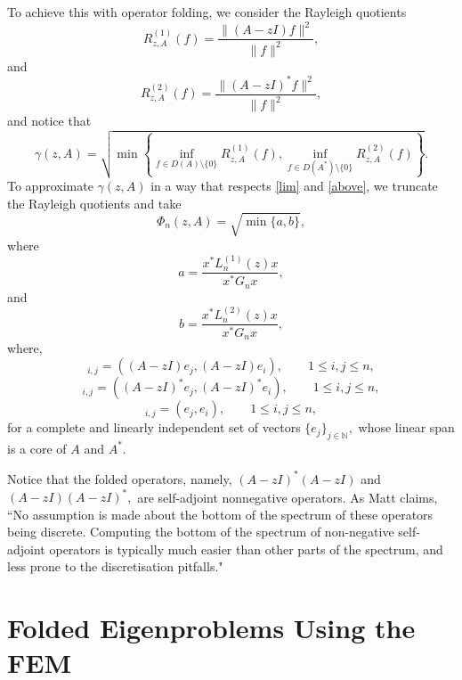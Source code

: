 \documentclass[12pt,a4paper]{article}
\theoremstyle{boldthm}
\theoremstyle{bolddefn}
\begin{document}
To achieve this with operator folding, we consider the Rayleigh quotients
\begin{equation}
    R_{z, A}^{(1)}(f) = \frac{\| (A-zI) f \|^2}{\|f\|^2}, 
\end{equation}
and 
\begin{equation}
    R_{z, A}^{(2)}(f) = \frac{\| (A-zI)^* f \|^2}{\|f\|^2},
\end{equation}
and notice that
\begin{equation}
    \gamma(z, A) = \sqrt{ \min \left\{ \inf_{f \in D(A) \setminus \{0\}} R_{z, A}^{(1)}(f) , \inf_{f \in D(A^*) \setminus \{0\}} R_{z, A}^{(2)}(f) \right\}}.
\end{equation}
To approximate $\gamma(z, A)$ in a way that respects \eqref{lim} and \eqref{above}, we truncate the Rayleigh quotients and take
\begin{equation}
    \Phi_n(z, A) = \sqrt{ \min\{a, b\} },
\end{equation}
where 
\begin{equation}
    a = \frac{x^* L_n^{(1)}(z) x}{x^* G_n x},
\end{equation}
and
\begin{equation}
    b = \frac{x^* L_n^{(2)}(z) x}{x^* G_n x},
\end{equation}
where, 
\begin{equation}
    [L_n^{(1)}(z)]_{i,j} = ( (A-zI) e_j, (A-zI) e_i ), \qquad 1 \le i, j \le n,
\end{equation}
\begin{equation}
    [L_n^{(2)}(z)]_{i,j} = ( (A-zI)^* e_j, (A-zI)^* e_i ), \qquad 1 \le i, j \le n,
\end{equation}
\begin{equation}
    [G_n]_{i,j} = ( e_j, e_i ), \qquad 1 \le i, j \le n,
\end{equation}
for a complete and linearly independent set of vectors $\{e_j\}_{j \in \mathbb{N}},$ whose linear span is a core of $A$ and $A^*.$ 

Notice that the folded operators, namely, $(A-zI)^*(A-zI)$ and $(A-zI)(A-zI)^*,$ are self-adjoint nonnegative operators. As Matt claims, ``No assumption is made about the bottom of the spectrum of these
operators being discrete. Computing the bottom of the spectrum of non-negative self-adjoint
operators is typically much easier than other parts of the spectrum, and less prone to the
discretisation pitfalls." 

\section{Folded Eigenproblems Using the FEM}
\end{document}
